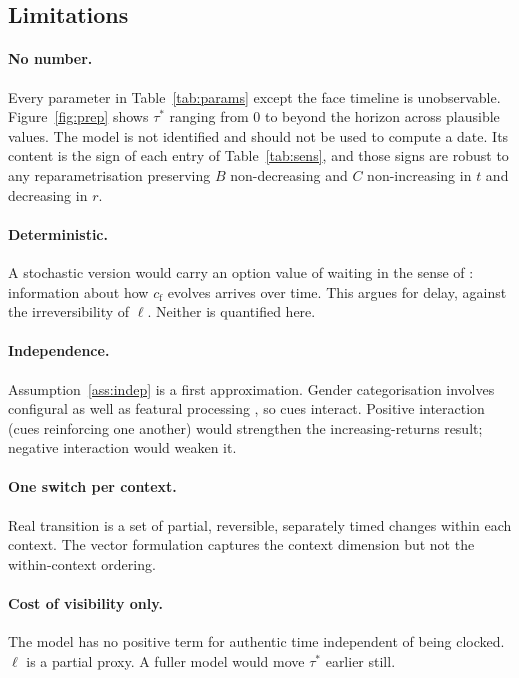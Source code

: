 \documentclass[11pt,a4paper]{article}
\theoremstyle{remark}
\newcommand{\cface}{c_{\mathrm{f}}}
\begin{document}
\subsection{Limitations}
\label{sec:limits}

\paragraph{No number.} Every parameter in Table~\ref{tab:params} except the face timeline is unobservable. Figure~\ref{fig:prep} shows $\tau^*$ ranging from $0$ to beyond the horizon across plausible values. The model is not identified and should not be used to compute a date. Its content is the sign of each entry of Table~\ref{tab:sens}, and those signs are robust to any reparametrisation preserving $B$ non-decreasing and $C$ non-increasing in $t$ and decreasing in $r$.

\paragraph{Deterministic.} A stochastic version would carry an option value of waiting in the sense of \cite{dixit1994}: information about how $\cface$ evolves arrives over time. This argues for delay, against the irreversibility of $\ell$. Neither is quantified here.

\paragraph{Independence.} Assumption~\ref{ass:indep} is a first approximation. Gender categorisation involves configural as well as featural processing \cite{brown1993}, so cues interact. Positive interaction (cues reinforcing one another) would strengthen the increasing-returns result; negative interaction would weaken it.

\paragraph{One switch per context.} Real transition is a set of partial, reversible, separately timed changes within each context. The vector formulation captures the context dimension but not the within-context ordering.

\paragraph{Cost of visibility only.} The model has no positive term for authentic time independent of being clocked. $\ell$ is a partial proxy. A fuller model would move $\tau^*$ earlier still.
\end{document}
